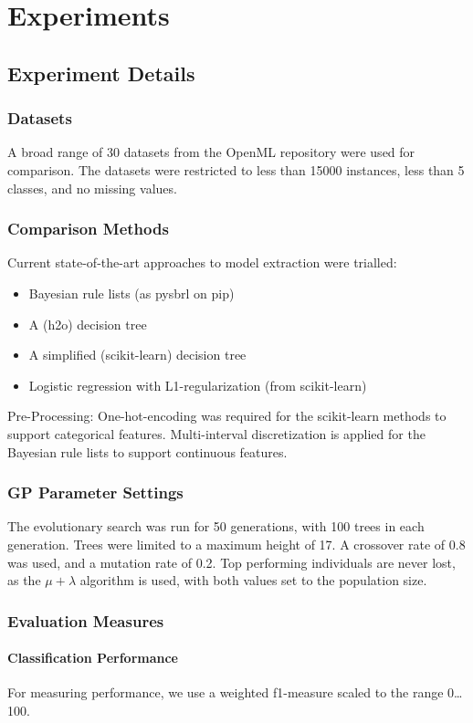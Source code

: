 \section{Experiments}
\subsection{Experiment Details}
\subsubsection{Datasets}
A broad range of 30 datasets from the OpenML repository \cite{Van:openml} were used for comparison. The datasets were restricted to less than 15000 instances, less than 5 classes, and no missing values.
\subsubsection{Comparison Methods}
Current state-of-the-art approaches to model extraction were trialled:
\begin{itemize}
\item Bayesian rule lists (as pysbrl on pip)
\item A (h2o) decision tree
\item A simplified (scikit-learn) decision tree
\item Logistic regression with L1-regularization (from scikit-learn)
\end{itemize}
Pre-Processing: One-hot-encoding was required for the scikit-learn methods to support categorical features. Multi-interval discretization is applied for the Bayesian rule lists to support continuous features.
\subsubsection{GP Parameter Settings}
The evolutionary search was run for 50 generations, with 100 trees in each generation. Trees were limited to a maximum height of 17. A crossover rate of 0.8 was used, and a mutation rate of 0.2. Top performing individuals are never lost, as the $\mu + \lambda$ algorithm \cite{Beyer:evo_strat} is used, with both values set to the population size.
\subsubsection{Evaluation Measures}
\paragraph{Classification Performance}
For measuring performance, we use a weighted f1-measure scaled to the range 0\ldots100.
